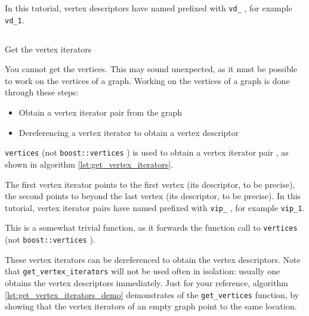 In this tutorial, 
vertex descriptors have named prefixed with \verb;vd_; , 
for example \verb;vd_1;.

\subsection{}
Get the vertex iterators
\label{subsec:get_vertices}

You cannot get the vertices.
This may sound unexpected, as it must be possible to work on the vertices
of a graph.
Working on the vertices of a graph is done through these steps:

\begin{itemize}
  \item Obtain a vertex iterator pair from the graph
  \item Dereferencing a vertex iterator to obtain a vertex descriptor 
\end{itemize}

\verb;vertices;  
(not \verb;boost::vertices; ) 
is used to obtain 
a vertex iterator pair , 
as shown in algorithm \ref{lst:get_vertex_iterators}.

The first vertex iterator 
points to the first vertex (its descriptor, to be precise), the second
points to beyond the last vertex (its descriptor, to be precise).
In this tutorial, vertex iterator pairs have named prefixed with 
\verb;vip_; , for example \verb;vip_1;.



This is a somewhat trivial function, 
as it forwards the function call to
\verb;vertices; 
(not \verb;boost::vertices; ).

These vertex iterators can be dereferenced to obtain the vertex descriptors.
Note that \verb;get_vertex_iterators; will not be used often in isolation: usually
one obtains the vertex descriptors immediately.
Just for your reference, algorithm 
\ref{lst:get_vertex_iterators_demo}
demonstrates of the \verb;get_vertices; function, by showing that the vertex
iterators of an empty graph point to the same location.



